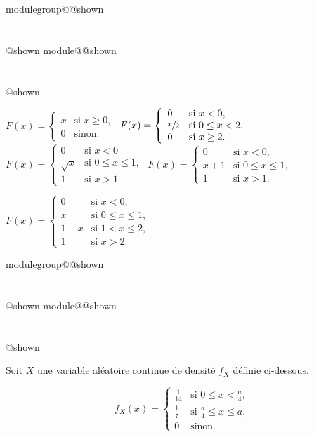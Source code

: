 \documentclass{Evaluation}
\makeatletter
\newcommand{\currentmodulekey}{}
\newcommand{\currentmoduletitle}{}
\newcommand{\currentgroupkey}{}
\newcommand{\currentgrouptitle}{}
\newcommand{\showmoduleifneeded}{%
  \ifx\currentgroupkey\empty\else
    \expandafter\ifx\csname modulegroup@\currentgroupkey @shown\endcsname\relax
      \section*{\currentgrouptitle}%
      \expandafter\gdef\csname modulegroup@\currentgroupkey @shown\endcsname{1}%
    \fi
  \fi
  \expandafter\ifx\csname module@\currentmodulekey @shown\endcsname\relax
    \section*{\currentmoduletitle}%
    \expandafter\gdef\csname module@\currentmodulekey @shown\endcsname{1}%
  \fi
}
\newenvironment{H25}{\showmoduleifneeded}{}
\newenvironment{H26r}{\showmoduleifneeded}{}
\makeatother
\begin{document}
\begin{questions}
\begin{H25}
\begin{checkboxes}
\choice $F(x)=\left\{
			\begin{array}{ll}
			x  & \mbox{si } x \ge 0, \\
			0 & \mbox{sinon.}
			\end{array}
			\right. $
\choice $ F(x) = \left\{
			\begin{array}{ll}
			0  & \mbox{si } x<0, \\
			\displaystyle \sfrac{x}{2} & \mbox{si } 0\leq x < 2,\\
			0 & \mbox{si } x \geq 2.
			\end{array}
			\right. $
\choice $ F(x) = \left\{
			\begin{array}{ll}
            0 & \mbox{si } x<0\\
			\sqrt{x}  & \mbox{si } 0\leq x\leq 1, \\
			1 & \mbox{si } x>1
			\end{array}
			\right. $
\choice $ F(x) = \left\{
			\begin{array}{ll}
			0  & \mbox{si } x < 0, \\
			x + 1& \mbox{si } 0 \leq x \leq 1,\\
			1 &  \mbox{si } x > 1.
			\end{array}
			\right. $

   \choice $ F(x) = \left\{
			\begin{array}{ll}
			0  & \mbox{si } x < 0, \\
			x & \mbox{si } 0 \leq x \leq 1,\\
                1-x & \mbox{si } 1< x \leq 2,\\
			1 &  \mbox{si } x> 2.
			\end{array}
			\right. $
\end{checkboxes}
\end{H25}

\begin{H26r}
\question {} %
Soit $X$ une variable aléatoire continue de densité $f_X$ définie ci-dessous.

\begin{minipage}[]{7cm}{
\vspace{0cm}
\[ f_X(x) = \begin{cases}
\displaystyle \frac{1}{14} & \mbox{si } 0\leq x < \displaystyle \frac{a}{4}, \\
\displaystyle \frac{1}{7} & \mbox{si } \displaystyle\frac{a}{4}\leq x \leq \displaystyle a, \\
\displaystyle 0 & \mbox{sinon.}
\end{cases} \]
    }
\end{minipage}
 \hspace{10mm}
\begin{minipage}[]{7cm}{
\vspace{0cm}
\begin{tikzpicture}[xscale=0.75, yscale=25]


\end{tikzpicture}}
\end{minipage}
\end{H26r}
\end{questions}
\end{document}
